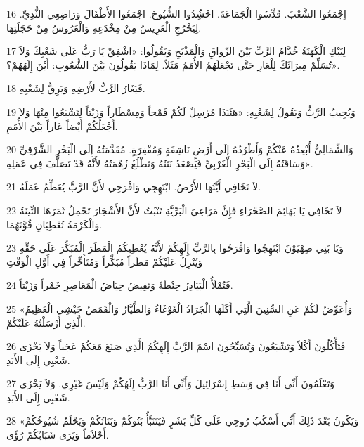 \par 16 اِجْمَعُوا الشَّعْبَ. قَدِّسُوا الْجَمَاعَةَ. احْشُِدُوا الشُّيُوخَ. اجْمَعُوا الأَطْفَالَ وَرَاضِعِي الثُّدِيِّ. لِيَخْرُجِ الْعَرِيسُ مِنْ مِخْدَعِهِ وَالْعَرُوسُ مِنْ حَجَلَتِهَا.
\par 17 لِيَبْكِ الْكَهَنَةُ خُدَّامُ الرَّبِّ بَيْنَ الرِّواقِ وَالْمَذْبَحِ وَيَقُولُوا: «اشْفِقْ يَا رَبُّ عَلَى شَعْبِكَ وَلاَ تُسَلِّمْ مِيرَاثَكَ لِلْعَارِ حَتَّى تَجْعَلَهُمُ الأُمَمُ مَثَلاً. لِمَاذَا يَقُولُونَ بَيْنَ الشُّعُوبِ: أَيْنَ إِلَهُهُمْ؟».
\par 18 فَيَغَارُ الرَّبُّ لأَرْضِهِ وَيَرِقُّ لِشَعْبِهِ.
\par 19 وَيُجِيبُ الرَّبُّ وَيَقُولُ لِشَعْبِهِ: «هَئَنَذَا مُرْسِلٌ لَكُمْ قَمْحاً وَمِسْطَاراً وَزَيْتاً لِتَشْبَعُوا مِنْهَا وَلاَ أَجْعَلُكُمْ أَيْضاً عَاراً بَيْنَ الأُمَمِ.
\par 20 وَالشِّمَالِيُّ أُبْعِدُهُ عَنْكُمْ وَأَطْرُدُهُ إِلَى أَرْضٍ نَاشِفَةٍ وَمُقْفِرَةٍ. مُقَدَّمَتُهُ إِلَى الْبَحْرِ الشَّرْقِيِّ وَسَاقَتُهُ إِلَى الْبَحْرِ الْغَرْبِيِّ فَيَصْعَدُ نَتَنُهُ وَتَطْلُعُ زُهْمَتُهُ لأَنَّهُ قَدْ تَصَلَّفَ فِي عَمَلِهِ».
\par 21 لاَ تَخَافِي أَيَّتُهَا الأَرْضُ. ابْتَهِجِي وَافْرَحِي لأَنَّ الرَّبَّ يُعَظِّمُ عَمَلَهُ.
\par 22 لاَ تَخَافِي يَا بَهَائِمَ الصَّحْرَاءِ فَإِنَّ مَرَاعِيَ الْبَرِّيَّةِ تَنْبُتُ لأَنَّ الأَشْجَارَ تَحْمِلُ ثَمَرَهَا التِّينَةُ وَالْكَرْمَةُ تُعْطِيَانِ قُوَّتَهُمَا.
\par 23 وَيَا بَنِي صِهْيَوْنَ ابْتَهِجُوا وَافْرَحُوا بِالرَّبِّ إِلَهِكُمْ لأَنَّهُ يُعْطِيكُمُ الْمَطَرَ الْمُبَكِّرَ عَلَى حَقِّهِ وَيُنْزِلُ عَلَيْكُمْ مَطَراً مُبَكِّراً وَمُتَأَخِّراً فِي أَوَّلِ الْوَقْتِ
\par 24 فَتُمْلَأُ الْبَيَادِرُ حِنْطَةً وَتَفِيضُ حِيَاضُ الْمَعَاصِرِ خَمْراً وَزَيْتاً.
\par 25 «وَأُعَوِّضُ لَكُمْ عَنِ السِّنِينَ الَّتِي أَكَلَهَا الْجَرَادُ الْغَوْغَاءُ وَالطَّيَّارُ وَالْقَمَصُ جَيْشِي الْعَظِيمُ الَّذِي أَرْسَلْتُهُ عَلَيْكُمْ.
\par 26 فَتَأْكُلُونَ أَكْلاً وَتَشْبَعُونَ وَتُسَبِّحُونَ اسْمَ الرَّبِّ إِلَهِكُمُ الَّذِي صَنَعَ مَعَكُمْ عَجَباً وَلاَ يَخْزَى شَعْبِي إِلَى الأَبَدِ.
\par 27 وَتَعْلَمُونَ أَنِّي أَنَا فِي وَسَطِ إِسْرَائِيلَ وَأَنِّي أَنَا الرَّبُّ إِلَهُكُمْ وَلَيْسَ غَيْرِي. وَلاَ يَخْزَى شَعْبِي إِلَى الأَبَدِ.
\par 28 «وَيَكُونُ بَعْدَ ذَلِكَ أَنِّي أَسْكُبُ رُوحِي عَلَى كُلِّ بَشَرٍ فَيَتَنَبَّأُ بَنُوكُمْ وَبَنَاتُكُمْ وَيَحْلَمُ شُيُوخُكُمْ أَحْلاَماً وَيَرَى شَبَابُكُمْ رُؤًى.
